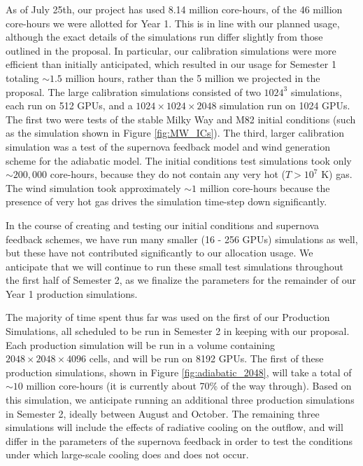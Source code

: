 \documentclass[11pt,letterpaper,english]{article}
\begin{document}
As of July 25th, our project has used 8.14 million core-hours, of the 46 million core-hours we were allotted for Year 1. This is in line with our planned usage, although the exact details of the simulations run differ slightly from those outlined in the proposal. In particular, our calibration simulations were more efficient than initially anticipated, which resulted in our usage for Semester 1 totaling $\sim1.5$ million hours, rather than the 5 million we projected in the proposal. The large calibration simulations consisted of two $1024^3$ simulations, each run on 512 GPUs, and a $1024\times1024\times2048$ simulation run on 1024 GPUs. The first two were tests of the stable Milky Way and M82 initial conditions (such as the simulation shown in Figure \ref{fig:MW_ICs}). The third, larger calibration simulation was a test of the supernova feedback model and wind generation scheme for the adiabatic model. The initial conditions test simulations took only $\sim200,000$ core-hours, because they do not contain any very hot ($T > 10^7$ K) gas. The wind simulation took approximately $\sim1$ million core-hours because the presence of very hot gas drives the simulation time-step down significantly.

In the course of creating and testing our initial conditions and supernova feedback schemes, we have run many smaller (16 - 256 GPUs) simulations as well, but these have not contributed significantly to our allocation usage. We anticipate that we will continue to run these small test simulations throughout the first half of Semester 2, as we finalize the parameters for the remainder of our Year 1 production simulations.

The majority of time spent thus far was used on the first of our Production Simulations, all scheduled to be run in Semester 2 in keeping with our proposal. Each production simulation will be run in a volume containing $2048\times2048\times4096$ cells, and will be run on 8192 GPUs. The first of these production simulations, shown in Figure \ref{fig:adiabatic_2048}, will take a total of $\sim10$ million core-hours (it is currently about 70\% of the way through). Based on this simulation, we anticipate running an additional three production simulations in Semester 2, ideally between August and October. The remaining three simulations will include the effects of radiative cooling on the outflow, and will differ in the parameters of the supernova feedback in order to test the conditions under which large-scale cooling does and does not occur.
\end{document}
